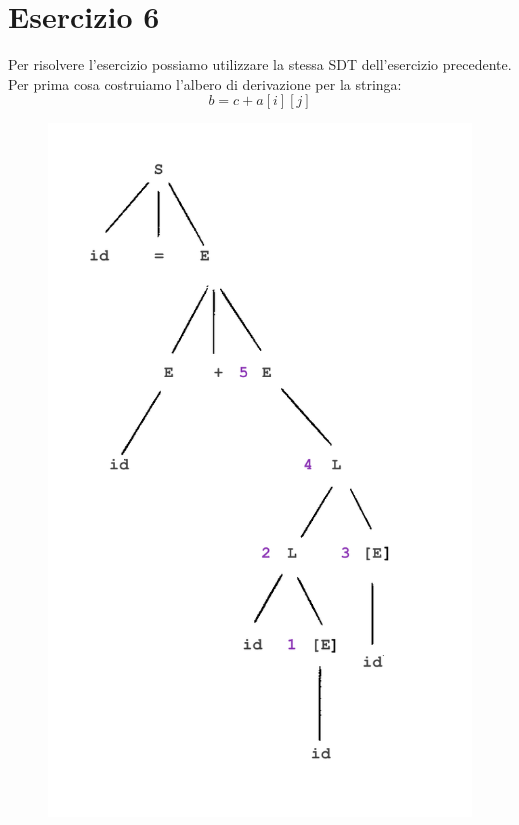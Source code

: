 \documentclass[11pt]{article}
\begin{document}
\section*{Esercizio 6}
Per risolvere l'esercizio possiamo utilizzare la stessa SDT dell'esercizio precedente.
Per prima cosa costruiamo l'albero di derivazione per la stringa:
$$b =  c + a[i][j]$$
\begin{center}
  \begin{minipage}[t]{\linewidth}
    \begin{multicols}{2}
      \begin{figure}[H]
        \includegraphics[width=\linewidth]{./img/06DerivationTree.png}

\end{figure}
\end{multicols}
\end{minipage}
\end{center}
\end{document}
